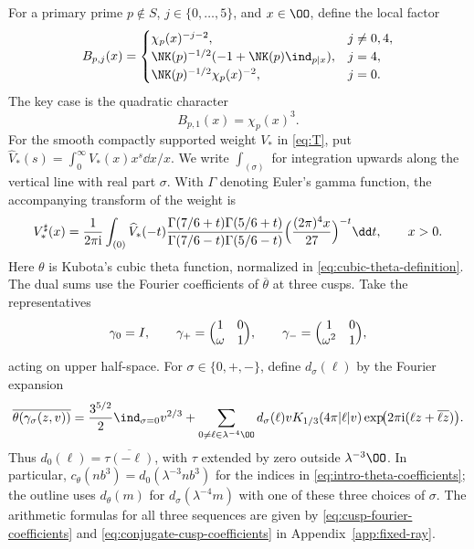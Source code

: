 For a primary prime $p\notin S$, $j\in\{0,\ldots,5\}$, and $x\in\OO$,
define the local factor
\begin{equation}\label{eq:theta-local-factors}
 B_{p,j}(x)=
 \begin{cases}
  \chi_p(x)^{-j-2},&j\ne0,4,\\
  \NK(p)^{-1/2}(-1+\NK(p)\ind_{p\mid x}),&j=4,\\
  \NK(p)^{-1/2}\chi_p(x)^{-2},&j=0.
 \end{cases}
\end{equation}
The key case is the quadratic character
\[
 B_{p,1}(x)=\chi_p(x)^3.
\]
For the smooth compactly supported weight $V_*$ in \eqref{eq:T},
put $\widehat V_*(s)=\int_0^\infty V_*(x)x^s\dd x/x$.
We write $\int_{(\sigma)}$ for integration upwards along the
vertical line with real part $\sigma$.
With $\Gamma$ denoting Euler's gamma function, the accompanying transform of the weight is
\begin{equation}\label{eq:theta-weight}
 V_*^\sharp(x)=\frac1{2\pi\mathrm i}\int_{(0)}
 \widehat V_*(-t)
 \frac{\Gamma(7/6+t)\Gamma(5/6+t)}
      {\Gamma(7/6-t)\Gamma(5/6-t)}
 \Bigl(\frac{(2\pi)^4x}{27}\Bigr)^{-t}\dd t,\qquad x>0.
\end{equation}
Here $\theta$ is Kubota's cubic theta function, normalized in
\eqref{eq:cubic-theta-definition}. The dual sums use the Fourier
coefficients of $\overline\theta$ at three cusps. Take the representatives
\begin{equation}\label{eq:theta-cusp-representatives}
 \gamma_0=I,\qquad
 \gamma_+=\Bigl(\begin{matrix}1&0\\\omega&1\end{matrix}\Bigr),\qquad
 \gamma_-=\Bigl(\begin{matrix}1&0\\\omega^2&1\end{matrix}\Bigr),
\end{equation}
acting on upper half-space. For $\sigma\in\{0,+,-\}$, define
$d_\sigma(\ell)$ by the Fourier expansion \cite[(5.9), (5.15)]{DR}
\begin{equation}\label{eq:cusp-coefficient-definition}
 \overline{\theta(\gamma_\sigma(z,v))}
 =\frac{3^{5/2}}2\ind_{\sigma=0}v^{2/3} +\sum_{0\ne\ell\in\lambda^{-4}\OO}
 d_\sigma(\ell)vK_{1/3}(4\pi|\ell|v)
 \exp\!\bigl(2\pi\mathrm i(\ell z+\overline{\ell z})\bigr).
\end{equation}
Thus $d_0(\ell)=\overline{\tau(-\ell)}$, with $\tau$ extended by zero
outside $\lambda^{-3}\OO$.
In particular, $c_\theta(nb^3)=d_0(\lambda^{-3}nb^3)$ for the indices in \eqref{eq:intro-theta-coefficients}; the outline uses $d_\theta(m)$ for $d_\sigma(\lambda^{-4}m)$ with one of these three choices of $\sigma$. The arithmetic formulas for all three
sequences are given by \eqref{eq:cusp-fourier-coefficients} and
\eqref{eq:conjugate-cusp-coefficients} in Appendix~\ref{app:fixed-ray}.

